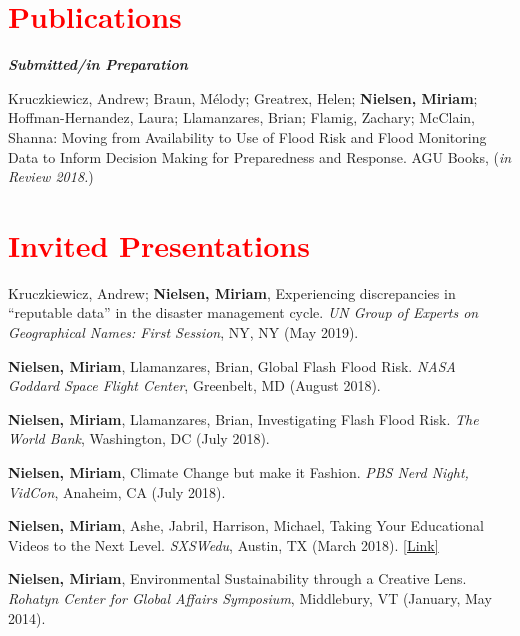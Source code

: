 \documentclass[margin,line,palatino,courier,10pt]{res}
\begin{document}
\begin{resume}
\begin{tabular}{@{}p{1 in}p{4in}}
\end{tabular}


\section{\sc \large{\textcolor{Red}{Publications}}}

\textit{\textbf{Submitted/in Preparation}}
\vspace*{-0.1in}\\
\begin{etaremune}[leftmargin=.2in,topsep=0in,parsep=0in]
\item Kruczkiewicz, Andrew; Braun, Mélody; Greatrex, Helen; \textbf{Nielsen, Miriam}; Hoffman-Hernandez, Laura; Llamanzares, Brian; Flamig, Zachary; McClain, Shanna: Moving from Availability to Use of Flood Risk and Flood Monitoring Data to Inform Decision Making for Preparedness and Response. AGU Books, (\textit{in Review 2018.})
\end{etaremune}

\section{\sc \textcolor{Red}{\large{Invited Presentations}}}
\begin{etaremune}[leftmargin=.2in,topsep=0in,parsep=0in]
\item  Kruczkiewicz, Andrew; \textbf{Nielsen, Miriam},  Experiencing discrepancies in “reputable data” in the disaster management cycle. \textit{UN Group of Experts on Geographical Names: First Session}, NY, NY (May 2019). 
\item  \textbf{Nielsen, Miriam}, Llamanzares, Brian, Global Flash Flood Risk. \textit{NASA Goddard Space Flight Center}, Greenbelt, MD (August 2018). 
\item  \textbf{Nielsen, Miriam}, Llamanzares, Brian, Investigating Flash Flood Risk. \textit{The World Bank}, Washington, DC (July 2018). 
\item  \textbf{Nielsen, Miriam}, Climate Change but make it Fashion. \textit{PBS Nerd Night, VidCon}, Anaheim, CA (July 2018).
\item  \textbf{Nielsen, Miriam}, Ashe, Jabril, Harrison, Michael, Taking Your Educational Videos to the Next Level. \textit{SXSWedu}, Austin, TX (March 2018). \href{https://schedule.sxswedu.com/2018/events/PP76461"}{[Link]}
\item  \textbf{Nielsen, Miriam}, Environmental Sustainability through a Creative Lens. \textit{Rohatyn Center for Global Affairs Symposium}, Middlebury, VT (January, May 2014). 
\end{etaremune}


\end{resume}
\end{document}
